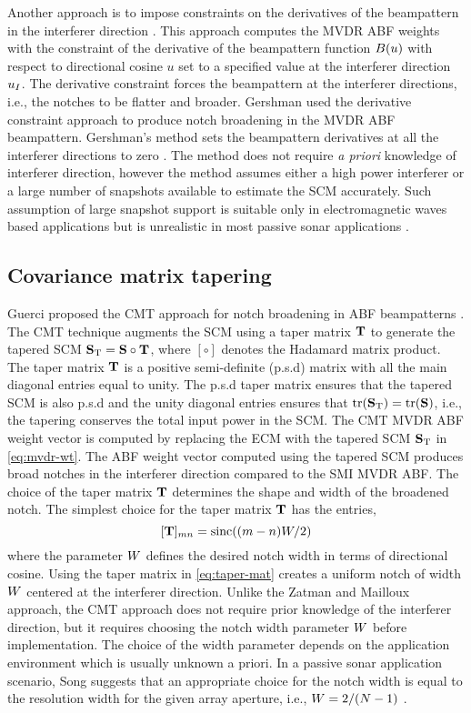 Another approach is to impose constraints on the derivatives of the
beampattern in the interferer direction
\cite[Sec.~6.7.1.4]{vtree2002oap}. This approach computes the MVDR ABF
weights with the constraint of the derivative of the beampattern
function $B(u)$ with respect to directional cosine $u$ set to a
specified value at the interferer direction $u_I$. The derivative
constraint forces the beampattern at the interferer directions, i.e.,
the notches to be flatter and broader. Gershman used the
derivative constraint approach to produce notch broadening in the MVDR ABF
beampattern. Gershman's method sets the beampattern derivatives at all
the interferer directions to zero \cite{gershman1991synthesis}. The
method does not require \emph{a priori} knowledge of interferer
direction, however the method assumes either a high power interferer
or a large number of snapshots available to estimate the SCM
accurately. Such assumption of large snapshot support is suitable only
in electromagnetic waves based applications but is unrealistic in most
passive sonar applications \cite{baggeroer1999passive}.

\subsection{Covariance matrix tapering}
\label{sec:cmt}
Guerci proposed the CMT approach for notch broadening in ABF
beampatterns \cite{guerci1999cmt}. The CMT technique augments the SCM
using a taper matrix $\mathbf{T}$ to generate the tapered SCM
${\bf S}_{\rm T} = {\bf S}\circ\mathbf{T}$, where $[\circ]$ denotes
the Hadamard matrix product. The taper matrix $\mathbf{T}$ is a
positive semi-definite (p.s.d) matrix with all the main diagonal
entries equal to unity. The p.s.d taper matrix ensures that the
tapered SCM is also p.s.d and the unity diagonal entries ensures that
$\rm tr({\bf S}_{\rm T}) = \rm tr({\bf S})$, i.e., the tapering conserves
the total input power in the SCM. The CMT MVDR ABF weight vector is
computed by replacing the ECM with the tapered SCM ${\bf S}_{\rm T}$
in \eqref{eq:mvdr-wt}. The ABF weight vector computed using the
tapered SCM produces broad notches in the interferer direction
compared to the SMI MVDR ABF. The choice of the taper matrix
$\mathbf{T}$ determines the shape and width of the broadened notch. The
simplest choice for the taper matrix $\mathbf{T}$ has the entries,
\begin{equation}
  \label{eq:taper-mat}
[\mathbf{T}]_{mn} = {\rm sinc}((m - n)W/2)  
\end{equation}
where the parameter $W$ defines the desired notch width in terms
of directional cosine. Using the taper matrix in \eqref{eq:taper-mat}
creates a uniform notch of width $W$ centered at the interferer
direction. Unlike the Zatman and Mailloux approach, the CMT approach
does not require prior knowledge of the interferer direction, but it
requires choosing the notch width parameter $W$ before
implementation. The choice of the width parameter depends on the
application environment which is usually unknown a priori. In a
passive sonar application scenario, Song suggests that an appropriate
choice for the notch width is equal to the resolution width for the
given array aperture, i.e., $W = 2/(N-1)$ \cite{song2003null}.

